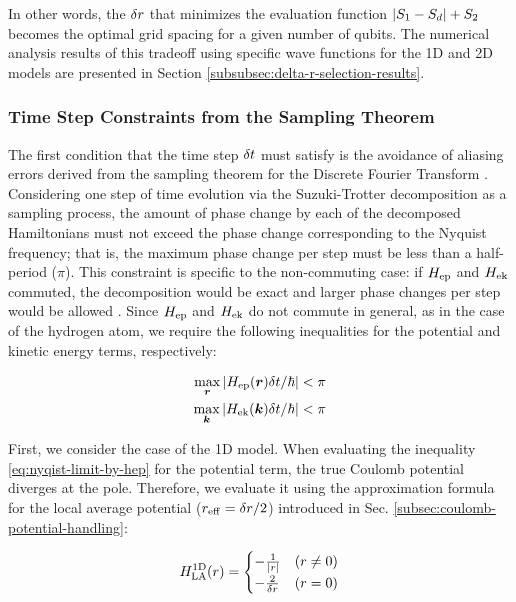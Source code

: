 \documentclass[aip-draft.tex]{subfiles}
\begin{document}
In other words, the $\delta r$ that minimizes the evaluation function ${\left| S_1 -
S_d \right|} + S_2$ becomes the optimal grid spacing for a given number of qubits. The
numerical analysis results of this tradeoff using specific wave functions for
the 1D and 2D models are presented in Section
\ref{subsubsec:delta-r-selection-results}.

\subsubsection{Time Step Constraints from the Sampling Theorem}

\label{subsubsec:time-step-constraints-from-sampling-theorem}

The first condition that the time step $\delta t$ must satisfy is the avoidance
of aliasing errors derived from the sampling theorem for the Discrete Fourier
Transform \cite{FEIT1982412}. Considering one step of time evolution via the
Suzuki-Trotter decomposition as a sampling process, the amount of phase change
by each of the decomposed Hamiltonians must not exceed the phase change
corresponding to the Nyquist frequency; that is, the maximum phase change per
step must be less than a half-period ($\pi$). This constraint is specific to the
non-commuting case: if $H_{\mathrm{ep}}$ and $H_{\mathrm{ek}}$ commuted, the decomposition would be
exact and larger phase changes per step would be allowed \cite{Kosloff1988}.
Since $H_{\mathrm{ep}}$ and $H_{\mathrm{ek}}$ do not commute in general, as in the case of the
hydrogen atom, we require the following inequalities for the potential and
kinetic energy terms, respectively:

\begin{align}
\max_{\bm{r}}{\left| H_{\mathrm{ep}}(\bm{r})\delta t/\hbar \right|} < \pi \label{eq:nyqist-limit-by-hep}\\
\max_{\bm{k}}{\left| H_{\mathrm{ek}}(\bm{k})\delta t/\hbar \right|} < \pi \label{eq:nyqist-limit-by-hek}
\end{align}

First, we consider the case of the 1D model. When evaluating the inequality
\eqref{eq:nyqist-limit-by-hep} for the potential term, the true Coulomb
potential diverges at the pole. Therefore, we evaluate it using the
approximation formula for the local average potential ($r_{\mathrm{eff}}=\delta r/2$)
introduced in Sec. \ref{subsec:coulomb-potential-handling}:

\begin{equation}
H_{\mathrm{LA}}^{\mathrm{1D}}(r) = \begin{cases}
-\frac{1}{{\left| r \right|}} & (r\neq0) \\
-\frac{2}{\delta r} & (r=0)
\end{cases}
\end{equation}
\end{document}

